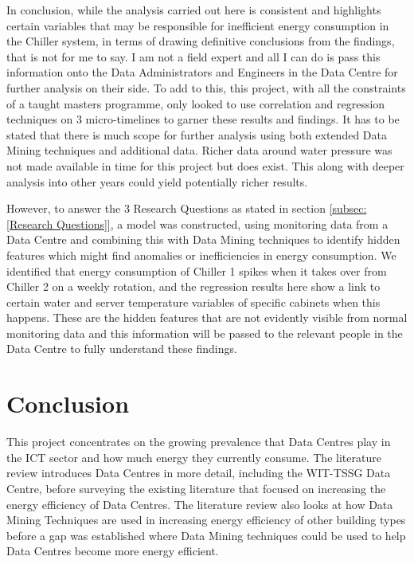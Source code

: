 \documentclass[12pt]{scrartcl}
\begin{document}
In conclusion, while the analysis carried out here is consistent and highlights certain variables that may be responsible for inefficient energy consumption in the Chiller system, in terms of drawing definitive conclusions from the findings, that is not for me to say. I am not a field expert and all I can do is pass this information onto the Data Administrators and Engineers in the Data Centre for further analysis on their side. To add to this, this project, with all the constraints of a taught masters programme, only looked to use correlation and regression techniques on 3 micro-timelines to garner these results and findings. It has to be stated that there is much scope for further analysis using both extended Data Mining techniques and additional data. Richer data around water pressure was not made available in time for this project but does exist. This along with deeper analysis into other years could yield potentially richer results.   

However, to answer the 3 Research Questions as stated in section \ref{subsec:[Research Questions]}, a model was constructed, using monitoring data from a Data Centre and combining this with Data Mining techniques to identify hidden features which might find anomalies or inefficiencies in energy consumption. We identified that energy consumption of Chiller 1 spikes when it takes over from Chiller 2 on a weekly rotation, and the regression results here show a link to certain water and server temperature variables of specific cabinets when this happens.   These are the hidden features that are not evidently visible from normal monitoring data and this information will be passed to the relevant people in the Data Centre to fully understand these findings.     

\section{Conclusion}
\label{sec:[Conclusion]}
This project concentrates on the growing prevalence that Data Centres play in the ICT sector and how much energy they currently consume. The literature review introduces Data Centres in more detail, including the WIT-TSSG Data Centre, before surveying the existing literature that focused on increasing the energy efficiency of Data Centres.  The literature review also looks at how Data Mining Techniques are used in increasing energy efficiency of other building types before a gap was established where Data Mining techniques could be used to help Data Centres become more energy efficient. 
\end{document}
